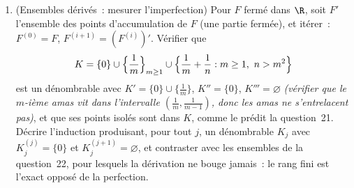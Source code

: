 \begin{problem}
\begin{enumerate}[resume]
        leurs images, et compter les points de la grille
        $\bigl(\frac iM, \frac jM\bigr)$, $0 \leq i, j \leq M$,
        qu'un ensemble de diamètre $< \frac1M$ peut contenir~;
        choisir $M$ d'ordre $N^\alpha$ et laisser $N \to
        \infty$. Situer notre courbe ($\alpha \approx 0.3155$)
        par rapport au mur, et noter sans preuve que la courbe
        de Hilbert atteint l'exposant critique $\frac12$.
  \item (Ensembles dérivés~: mesurer l'imperfection) Pour $F$
        fermé dans $\R$, soit $F'$ l'ensemble des points
        d'accumulation de $F$ (une partie fermée), et itérer~:
        $F^{(0)} = F$, $F^{(i+1)} = (F^{(i)})'$. Vérifier que
        \[
        K = \{0\} \cup \Bigl\{\frac1m\Bigr\}_{m \geq 1} \cup
        \Bigl\{\frac1m + \frac1n : m \geq 1,\ n > m^2\Bigr\}
        \]
        est un  dénombrable avec $K' = \{0\} \cup
        \{\frac1m\}$, $K'' = \{0\}$, $K''' = \varnothing$
        \emph{(vérifier que le $m$-ième amas vit dans
        l'intervalle $(\frac1m, \frac1{m-1})$, donc les amas
        ne s'entrelacent pas)}, et que ses points isolés sont
         dans $K$, comme le prédit la question~21.
        Décrire l'induction produisant, pour tout $j$, un
         dénombrable $K_j$ avec $K_j^{(j)} = \{0\}$ et
        $K_j^{(j+1)} = \varnothing$, et contraster avec les
        ensembles  de la question~22, pour lesquels
        la dérivation ne bouge jamais~: le rang fini est
        l'exact opposé de la perfection.
\end{enumerate}
\end{problem}
